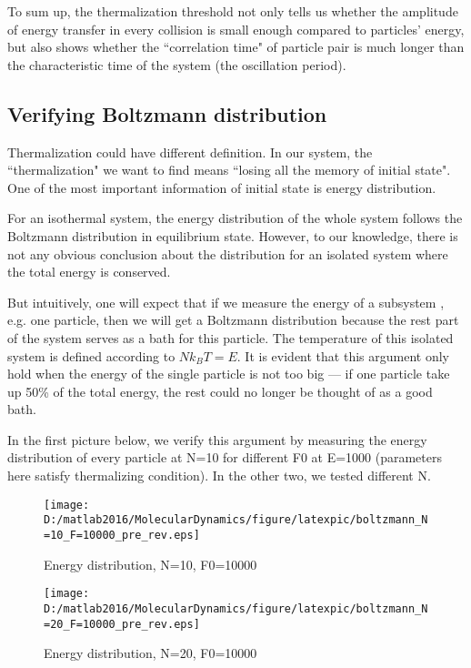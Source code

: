 \documentclass[aps,pre,twocolumn,groupedaddress]{revtex4-1}
\begin{document}
To sum up, the thermalization threshold not only tells us whether the amplitude of energy transfer in every collision is small enough compared to particles' energy, but also shows whether the ``correlation time" of particle pair is much longer than the characteristic time of the system (the oscillation period).  


\subsection{Verifying Boltzmann distribution}
Thermalization could have different definition. In our system, the ``thermalization" we want to find means ``losing all the memory of initial state". One of the most important information of initial state is energy distribution. 
 
For an isothermal system, the energy distribution of the whole system follows the Boltzmann distribution in equilibrium state. However, to our knowledge, there is not any obvious conclusion about the distribution for an isolated system where the total energy is conserved.

But intuitively, one will expect that if we measure the energy of a subsystem , e.g. one particle, then we will get a Boltzmann distribution because the rest part of the system serves as a bath for this particle. The temperature of this isolated system is defined according to $Nk_BT=E$. It is evident that this argument only hold when the energy of the single particle is not too big --- if one particle take up 50\% of the total energy, the rest could no longer be thought of as a good bath.

In the first picture below, we verify this argument by measuring the energy distribution of every particle at N=10 for different F0 at E=1000 (parameters here satisfy thermalizing condition). In the other two, we tested different N.


\begin{figure}[hbtp]
\centering

\texttt{[image: D:/matlab2016/MolecularDynamics/figure/latexpic/boltzmann\_N=10\_F=10000\_pre\_rev.eps]}
\caption{Energy distribution, N=10, F0=10000}
\label{fig:thermalization9}

\texttt{[image: D:/matlab2016/MolecularDynamics/figure/latexpic/boltzmann\_N=20\_F=10000\_pre\_rev.eps]} 
\caption{Energy distribution, N=20, F0=10000}
\label{fig:thermalization10}
\end{figure}
\end{document}
